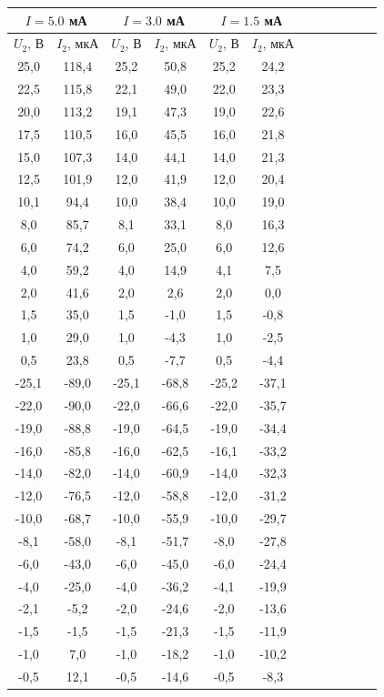 \documentclass[14pt]{article}
\begin{document}
\begin{center}
\begin{tabular}{|c|c|c|c|c|c|c|c|c|c|c|c|}
\hline
\multicolumn{2}{|c|}{$I = 5.0$ мА}&\multicolumn{2}{|c|}{$I = 3.0$ мА}&\multicolumn{2}{|c|}{$I = 1.5$ мА}\\
\hline
$U_2$, В&$I_2$, мкА&$U_2$, В&$I_2$, мкА&$U_2$, В&$I_2$, мкА\\
\hline
25,0&118,4&25,2&50,8&25,2&24,2\\
\hline
22,5&115,8&22,1&49,0&22,0&23,3\\
\hline
20,0&113,2&19,1&47,3&19,0&22,6\\
\hline
17,5&110,5&16,0&45,5&16,0&21,8\\
\hline
15,0&107,3&14,0&44,1&14,0&21,3\\
\hline
12,5&101,9&12,0&41,9&12,0&20,4\\
\hline
10,1&94,4&10,0&38,4&10,0&19,0\\
\hline
8,0&85,7&8,1&33,1&8,0&16,3\\
\hline
6,0&74,2&6,0&25,0&6,0&12,6\\
\hline
4,0&59,2&4,0&14,9&4,1&7,5\\
\hline
2,0&41,6&2,0&2,6&2,0&0,0\\
\hline
1,5&35,0&1,5&-1,0&1,5&-0,8\\
\hline
1,0&29,0&1,0&-4,3&1,0&-2,5\\
\hline
0,5&23,8&0,5&-7,7&0,5&-4,4\\
\hline
-25,1&-89,0&-25,1&-68,8&-25,2&-37,1\\
\hline
-22,0&-90,0&-22,0&-66,6&-22,0&-35,7\\
\hline
-19,0&-88,8&-19,0&-64,5&-19,0&-34,4\\
\hline
-16,0&-85,8&-16,0&-62,5&-16,1&-33,2\\
\hline
-14,0&-82,0&-14,0&-60,9&-14,0&-32,3\\
\hline
-12,0&-76,5&-12,0&-58,8&-12,0&-31,2\\
\hline
-10,0&-68,7&-10,0&-55,9&-10,0&-29,7\\
\hline
-8,1&-58,0&-8,1&-51,7&-8,0&-27,8\\
\hline
-6,0&-43,0&-6,0&-45,0&-6,0&-24,4\\
\hline
-4,0&-25,0&-4,0&-36,2&-4,1&-19,9\\
\hline
-2,1&-5,2&-2,0&-24,6&-2,0&-13,6\\
\hline
-1,5&-1,5&-1,5&-21,3&-1,5&-11,9\\
\hline
-1,0&7,0&-1,0&-18,2&-1,0&-10,2\\
\hline
-0,5&12,1&-0,5&-14,6&-0,5&-8,3\\
\hline
\end{tabular}
\end{center}
\end{document}
